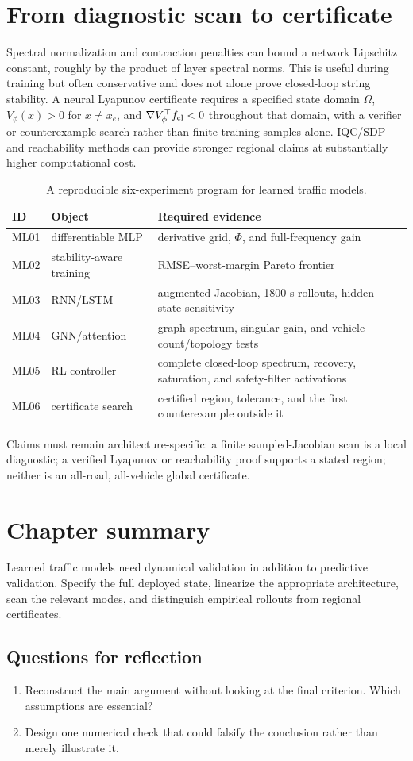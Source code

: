 \documentclass[11pt,a4paper,openany]{book}
\numberwithin{equation}{chapter}
\numberwithin{figure}{chapter}
\numberwithin{table}{chapter}
\newcommand{\chapterend}[1]{\section*{Chapter summary}\addcontentsline{toc}{section}{Chapter summary}\begin{tcolorbox}[resultbox]#1\end{tcolorbox}\subsection*{Questions for reflection}\begin{enumerate}[leftmargin=1.7em]\item Reconstruct the main argument without looking at the final criterion. Which assumptions are essential?\item Design one numerical check that could falsify the conclusion rather than merely illustrate it.\end{enumerate}\clearpage}
\begin{document}
\section{From diagnostic scan to certificate}
Spectral normalization and contraction penalties can bound a network Lipschitz constant, roughly by the product of layer spectral norms. This is useful during training but often conservative and does not alone prove closed-loop string stability. A neural Lyapunov certificate requires a specified state domain $\Omega$, $V_\phi(x)>0$ for $x\ne x_e$, and $\nabla V_\phi^\top f_{\rm cl}<0$ throughout that domain, with a verifier or counterexample search rather than finite training samples alone. IQC/SDP and reachability methods can provide stronger regional claims at substantially higher computational cost.

\begin{table}[htbp]\centering\caption{A reproducible six-experiment program for learned traffic models.}\label{tab:ml-experiments}
\begin{tabular}{p{1cm}p{3.3cm}p{7.4cm}}\toprule
ID & Object & Required evidence\\\midrule
ML01 & differentiable MLP & derivative grid, $\Phi$, and full-frequency gain\\
ML02 & stability-aware training & RMSE--worst-margin Pareto frontier\\
ML03 & RNN/LSTM & augmented Jacobian, 1800-s rollouts, hidden-state sensitivity\\
ML04 & GNN/attention & graph spectrum, singular gain, and vehicle-count/topology tests\\
ML05 & RL controller & complete closed-loop spectrum, recovery, saturation, and safety-filter activations\\
ML06 & certificate search & certified region, tolerance, and the first counterexample outside it\\\bottomrule
\end{tabular}\end{table}
Claims must remain architecture-specific: a finite sampled-Jacobian scan is a local diagnostic; a verified Lyapunov or reachability proof supports a stated region; neither is an all-road, all-vehicle global certificate.

\chapterend{Learned traffic models need dynamical validation in addition to predictive validation. Specify the full deployed state, linearize the appropriate architecture, scan the relevant modes, and distinguish empirical rollouts from regional certificates.}
\end{document}
